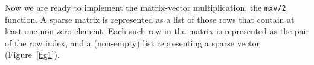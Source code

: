 %
%
%
%

Now we are ready to implement the matrix-vector multiplication, the
\lstinline[language=myerlang]{mxv/2} function. A sparse matrix is represented as a list of
those rows that contain at least one non-zero element. Each such row in
the matrix is represented as the pair of the row index, and a
(non-empty) list representing a sparse vector (Figure~\ref{fig1}).

